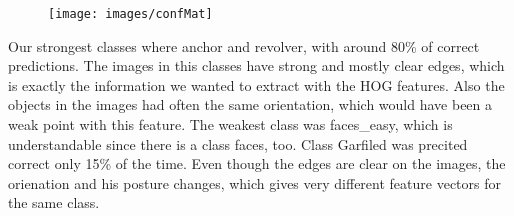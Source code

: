 \documentclass[a4paper,10pt]{article}
\begin{document}
\begin{figure}
\centering
\texttt{[image: images/confMat]}
\caption[confusion matrix]{}
\label{fig:confMat}
\end{figure}


Our strongest classes where anchor and revolver, with around 80\% of correct predictions. 
The images in this classes have strong and mostly clear edges, which is exactly the information we wanted to extract with the HOG features. 
Also the objects in the images had often the same orientation, which would have been a weak point with this feature.
The weakest class was faces\_easy, which is understandable since there is a class faces, too. Class Garfiled was precited correct only 15\% of the time. Even though the edges are clear on the images, the orienation and his posture changes, which gives very different feature vectors for the same class.



\end{document}
